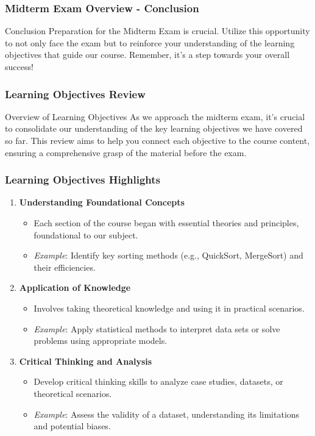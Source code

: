 \documentclass[aspectratio=169]{beamer}
\begin{document}
\begin{frame}[fragile]
    \frametitle{Midterm Exam Overview - Conclusion}
    \begin{block}{Conclusion}
        Preparation for the Midterm Exam is crucial. Utilize this opportunity to not only face the exam but to reinforce your understanding of the learning objectives that guide our course. Remember, it’s a step towards your overall success!
    \end{block}
\end{frame}

\begin{frame}[fragile]
    \frametitle{Learning Objectives Review}
    \begin{block}{Overview of Learning Objectives}
        As we approach the midterm exam, it's crucial to consolidate our understanding of the key learning objectives we have covered so far. This review aims to help you connect each objective to the course content, ensuring a comprehensive grasp of the material before the exam.
    \end{block}
\end{frame}

\begin{frame}[fragile]
    \frametitle{Learning Objectives Highlights}
    \begin{enumerate}
        \item \textbf{Understanding Foundational Concepts} 
            \begin{itemize}
                \item Each section of the course began with essential theories and principles, foundational to our subject.
                \item \textit{Example}: Identify key sorting methods (e.g., QuickSort, MergeSort) and their efficiencies.
            \end{itemize}
        
        \item \textbf{Application of Knowledge}
            \begin{itemize}
                \item Involves taking theoretical knowledge and using it in practical scenarios.
                \item \textit{Example}: Apply statistical methods to interpret data sets or solve problems using appropriate models.
            \end{itemize}
        
        \item \textbf{Critical Thinking and Analysis}
            \begin{itemize}
                \item Develop critical thinking skills to analyze case studies, datasets, or theoretical scenarios.
                \item \textit{Example}: Assess the validity of a dataset, understanding its limitations and potential biases.
            \end{itemize}
    \end{enumerate}
\end{frame}
\end{document}
